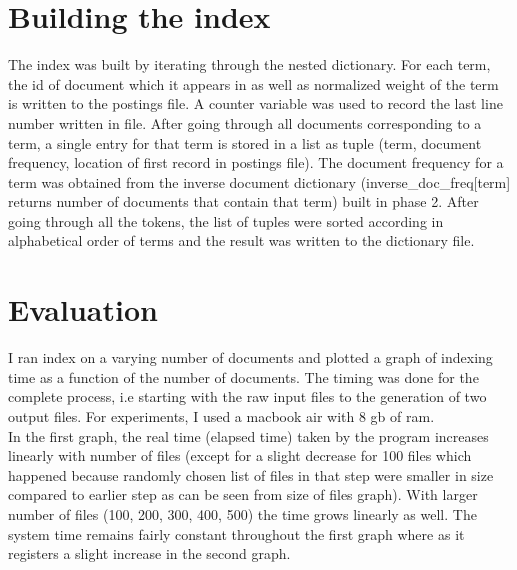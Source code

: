 \documentclass[paper=a4, fontsize=11pt]{scrartcl}
\numberwithin{equation}{section}		%
\numberwithin{figure}{section}			%
\numberwithin{table}{section}				%
\begin{document}
\section{Building the index}

The index was built by iterating through the nested dictionary. For each term, the id of document which it appears in as well as normalized weight of the term is written to the postings file. A counter variable was used to record the last line number written in file. After going through all documents corresponding to a term, a single entry for that term is stored in a list as tuple (term, document frequency, location of first record in postings file). The document frequency for a term was obtained from the inverse document dictionary (inverse\_doc\_freq[term] returns number of documents that contain that term) built in phase 2. After going through all the tokens, the list of tuples were sorted according in alphabetical order of terms and the result was written to the dictionary file.      

\section{Evaluation}

I ran index on a varying number of documents and plotted a graph of indexing time as a function of the number of documents. The timing was done for the complete process, i.e starting with the raw input files to the generation of two output files. For experiments, I used a macbook air with 8 gb of ram. \\

In the first graph, the real time (elapsed time) taken by the program increases linearly with number of files (except for a slight decrease for 100 files which happened because randomly chosen list of files in that step were smaller in size compared to earlier step as can be seen from size of files graph). With larger number of files (100, 200, 300, 400, 500) the time grows linearly  as well. The system time remains fairly constant throughout the first graph where as it registers a slight increase in the second graph.  \\
\end{document}
